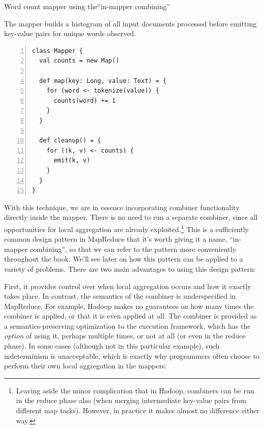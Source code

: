 \documentclass[11pt]{article}
\begin{document}
\begin{algorithm}[t]
\caption{Word count mapper using the``in-mapper combining''}
\label{algorithm:chapter3:word-count:outer-hash}
The mapper builds a histogram of all input documents processed before
emitting key-value pairs for unique words observed.
\begin{small}
\begin{Verbatim}[numbers=left, xleftmargin=7.5mm]
class Mapper {
  val counts = new Map()

  def map(key: Long, value: Text) = {
    for (word <- tokenize(value)) {
      counts(word) += 1
    }
  }

  def cleanup() = {
    for ((k, v) <- counts) {
      emit(k, v)
    }
  }
}
\end{Verbatim}
\end{small}
\end{algorithm}

With this technique, we are in essence incorporating combiner
functionality directly inside the mapper.  There is no need to run a
separate combiner, since all opportunities for local aggregation are
already exploited.\footnote{Leaving aside the minor complication that
  in Hadoop, combiners can be run in the reduce phase also (when
  merging intermediate key-value pairs from different map tasks).
  However, in practice it makes almost no difference either way.} This
is a sufficiently common design pattern in MapReduce that it's worth
giving it a name, ``in-mapper combining'', so that we can refer to the
pattern more conveniently throughout the book.  We'll see later on how
this pattern can be applied to a variety of problems.  There are two
main advantages to using this design pattern:

First, it provides control over when local aggregation occurs and how
it exactly takes place.  In contrast, the semantics of the combiner is
underspecified in MapReduce.  For example, Hadoop makes no guarantees
on how many times the combiner is applied, or that it is even applied
at all.  The combiner is provided as a semantics-preserving
optimization to the execution framework, which has the \emph{option} of
using it, perhaps multiple times, or not at all (or even in the reduce
phase).  In some cases (although not in this particular example), such
indeterminism is unacceptable, which is exactly why programmers often
choose to perform their own local aggregation in the mappers.
\end{document}
